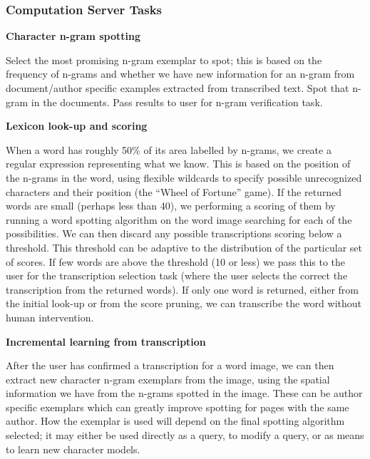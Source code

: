 \documentclass[ms]{byuprop}
\begin{document}
\subsubsection{Computation Server Tasks}

{\setlength{\parindent}{0cm}
\textbf{Character n-gram spotting}

\begin{addmargin}[3em]{3em}
Select the most promising n-gram exemplar to spot; this is based on the frequency of n-grams and whether we have new information for an n-gram from document/author specific examples extracted from transcribed text. Spot that n-gram in the documents. Pass results to user for n-gram verification task.
\\[.5cm]
\end{addmargin}


\textbf{Lexicon look-up and scoring}

\begin{addmargin}[3em]{3em}
When a word has roughly 50\% of its area labelled by n-grams, we create a regular expression representing what we know. This is based on the position of the n-grams in the word, using flexible wildcards to specify possible unrecognized characters and their position (the ``Wheel of Fortune'' game). If the returned words are small (perhaps less than 40), we performing a scoring of them by running a word spotting algorithm on the word image searching for each of the possibilities. We can then discard any possible transcriptions scoring below a threshold. This threshold can be adaptive to the distribution of the particular set of scores. If few words are above the threshold (10 or less) we pass this to the user for the transcription selection task (where the user selects the correct the transcription from the returned words). If only one word is returned, either from the initial look-up or from the score pruning, we can transcribe the word without human intervention.
\\[.5cm]
\end{addmargin}

\textbf{Incremental learning from transcription}

\begin{addmargin}[3em]{3em}
After the user has confirmed a transcription for a word image, we can then extract new character n-gram exemplars from the image, using the spatial information we have from the n-grams spotted in the image. These can be author specific exemplars which can greatly improve spotting for pages with the same author. How the exemplar is used will depend on the final spotting algorithm selected; it may either be used directly as a query, to modify a query, or as means to learn new character models.
\\[.5cm]
\end{addmargin}
}
\end{document}
